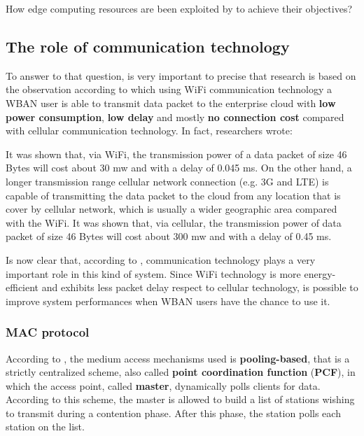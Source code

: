 \documentclass[sigchi]{acmart}
\begin{document}
How edge computing resources are been exploited by \citet{MSAReport} to achieve their objectives? 

\subsection{The role of communication technology}

To answer to that question, is very important to precise that \citet{MSAReport} research is based on the observation according to which using WiFi communication technology a WBAN user is able to transmit data packet to the enterprise cloud with \textbf{low power consumption}, \textbf{low delay} and mostly \textbf{no connection cost} compared with cellular communication technology. In fact, researchers wrote:

\vspace{0.3cm}

\begin{quoting}[font=itshape, begintext={``}, endtext={''\cite[par.~3.1]{MSAReport}}]
It was shown that, via WiFi, the transmission power of a data packet of size 46 Bytes will cost about 30 mw and with a delay of 0.045 ms. On the other hand, a longer transmission range cellular network connection (e.g. 3G and LTE) is capable of transmitting the data packet to the cloud from any location that is cover by cellular network, which is usually a wider geographic area compared with the WiFi. It was shown that, via cellular, the transmission power of data packet of size 46 Bytes will cost about 300 mw and with a delay of 0.45 ms.
\end{quoting}

\vspace{0.3cm}

Is now clear that, according to \citet{MSAReport}, communication technology plays a very important role in this kind of system. Since WiFi technology is more energy-efficient and exhibits less packet delay respect to cellular technology, is possible to improve system performances when WBAN users have the chance to use it.

\subsubsection{MAC protocol}

According to \citet{MSAReport}, the medium access mechanisms used is \textbf{pooling-based}, that is a strictly centralized scheme, also called \textbf{point coordination function} (\textbf{PCF}), in which the access point, called \textbf{master}, dynamically polls clients for data. According to this scheme, the master is allowed to build a list of stations wishing to transmit during a contention phase. After this phase, the station polls each station on the list.
\end{document}
